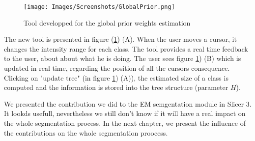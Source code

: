 %
%
%
%
%
%
%


  \begin{figure}\centering
  \texttt{[image: Images/Screenshots/GlobalPrior.png]}
  \caption{Tool developped for the global prior weights estimation}\label{fig:globalpriors}
  \end{figure}

The new tool is presented in figure (\ref{fig:globalpriors}) (A). When the user moves a cursor, it changes the intensity range for each class. The tool provides a real time feedback to the user, about about what he is doing. The user sees figure \ref{fig:globalpriors}) (B) which is updated in real time, regarding the position of all the cursors consequence. Clicking on "update tree" (in figure \ref{fig:globalpriors}) (A)), the estimated size of a class is computed and the information is stored into the tree structure (parameter $H$).\\
\par
We presented the contribution we did to the EM semgentation module in Slicer 3. It lookds usefull, nevertheless we still don't know if it will have a real impact on the whole segmentation process. In the next chapter, we present the influence of the contributions on the whole segmentation proocess.


